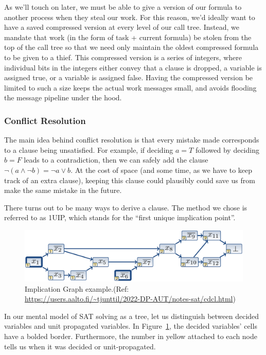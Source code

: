 \documentclass{article}
\begin{document}
As we'll touch on later, we must be able to give a version of our formula to another process when they steal our work. For this reason, we'd ideally want to have a saved compressed version at every level of our call tree. Instead, we mandate that work (in the form of task + current formula) be stolen from the top of the call tree so that we need only maintain the oldest compressed formula to be given to a thief. This compressed version is a series of integers, where individual bits in the integers either convey that a clause is dropped, a variable is assigned true, or a variable is assigned false. Having the compressed version be limited to such a size keeps the actual work messages small, and avoids flooding the message pipeline under the hood.

\subsubsection{Conflict Resolution}
The main idea behind conflict resolution is that every mistake made corresponds to a clause being unsatisfied.
For example, if deciding $a=T$ followed by deciding $b=F$ leads to a contradiction, then we can safely add the clause $\neg (a \land \neg b) = \neg a \lor b$.
At the cost of space (and some time, as we have to keep track of an extra clause), keeping this clause could plausibly could save us from make the same mistake in the future.

There turns out to be many ways to derive a clause.
The method we chose is referred to as 1UIP, which stands for the ``first unique implication point''.

\begin{figure}
    \centering
    \includegraphics[width=\linewidth]{images/CDCL_1.png}
    \caption{Implication Graph example.\newline (Ref: \url{https://users.aalto.fi/~tjunttil/2022-DP-AUT/notes-sat/cdcl.html})}
    \label{fig:CDCL}
\end{figure}

In our mental model of SAT solving as a tree, let us distinguish between decided variables and unit propagated variables.
In Figure~\ref{fig:CDCL}, the decided variables' cells have a bolded border.
Furthermore, the number in yellow attached to each node tells us when it was decided or unit-propagated.
\end{document}
